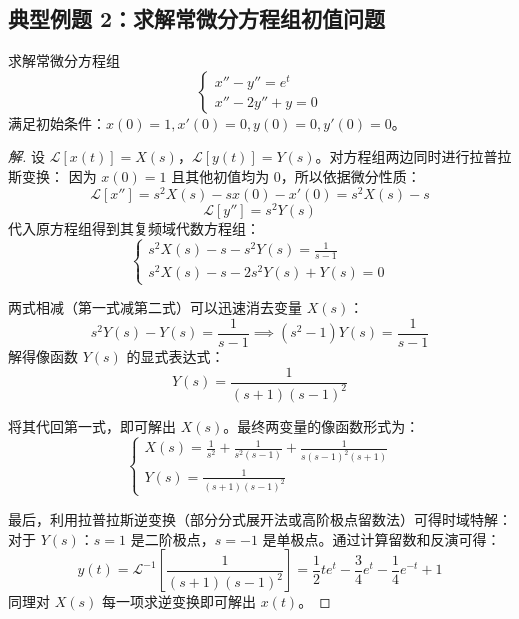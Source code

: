 \subsection{典型例题 2：求解常微分方程组初值问题}
\begin{tcolorbox}[colback=orange!5!white, colframe=orange!75!black, title=例题 \thechapter.2]
	求解常微分方程组
	$$ \begin{cases} x'' - y'' = e^t \\ x'' - 2y'' + y = 0 \end{cases} $$
	满足初始条件：$x(0) = 1, x'(0) = 0, y(0) = 0, y'(0) = 0$。
\end{tcolorbox}
\begin{proof}[解]
	设 $\mathcal{L}[x(t)] = X(s)$，$\mathcal{L}[y(t)] = Y(s)$。对方程组两边同时进行拉普拉斯变换：
	因为 $x(0)=1$ 且其他初值均为 0，所以依据微分性质：
	$$ \mathcal{L}[x''] = s^2X(s) - sx(0) - x'(0) = s^2X(s) - s $$
	$$ \mathcal{L}[y''] = s^2Y(s) $$
	代入原方程组得到其复频域代数方程组：
	$$ \begin{cases} s^2X(s) - s - s^2Y(s) = \frac{1}{s-1} \\ s^2X(s) - s - 2s^2Y(s) + Y(s) = 0 \end{cases} $$
	
	两式相减（第一式减第二式）可以迅速消去变量 $X(s)$：
	$$ s^2Y(s) - Y(s) = \frac{1}{s-1} \implies (s^2 - 1)Y(s) = \frac{1}{s-1} $$
	解得像函数 $Y(s)$ 的显式表达式：
	$$ Y(s) = \frac{1}{(s+1)(s-1)^2} $$
	
	将其代回第一式，即可解出 $X(s)$。最终两变量的像函数形式为：
	$$ \begin{cases} X(s) = \frac{1}{s^2} + \frac{1}{s^2(s-1)} + \frac{1}{s(s-1)^2(s+1)} \\ Y(s) = \frac{1}{(s+1)(s-1)^2} \end{cases} $$
	
	最后，利用拉普拉斯逆变换（部分分式展开法或高阶极点留数法）可得时域特解：
	对于 $Y(s)$：$s=1$ 是二阶极点，$s=-1$ 是单极点。通过计算留数和反演可得：
	$$ y(t) = \mathcal{L}^{-1}\left[\frac{1}{(s+1)(s-1)^2}\right] = \frac{1}{2}te^t - \frac{3}{4}e^t - \frac{1}{4}e^{-t} + 1 $$
	同理对 $X(s)$ 每一项求逆变换即可解出 $x(t)$。
\end{proof}